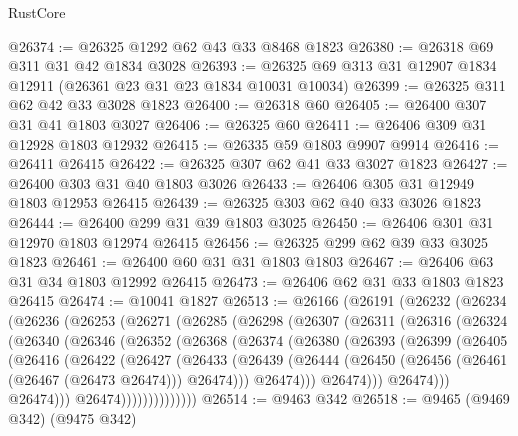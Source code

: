 \begin{lexlean}{RustCore}
\begin{coremodule}
@26374 := @26325 @1292 @62 @43 @33 @8468 @1823
@26380 := @26318 @69 @311 @31 @42 @1834 @3028
@26393 := @26325 @69 @313 @31 @12907 @1834 @12911 (@26361 @23 @31 @23 @1834 @10031 @10034)
@26399 := @26325 @311 @62 @42 @33 @3028 @1823
@26400 := @26318 @60
@26405 := @26400 @307 @31 @41 @1803 @3027
@26406 := @26325 @60
@26411 := @26406 @309 @31 @12928 @1803 @12932
@26415 := @26335 @59 @1803 @9907 @9914
@26416 := @26411 @26415
@26422 := @26325 @307 @62 @41 @33 @3027 @1823
@26427 := @26400 @303 @31 @40 @1803 @3026
@26433 := @26406 @305 @31 @12949 @1803 @12953 @26415
@26439 := @26325 @303 @62 @40 @33 @3026 @1823
@26444 := @26400 @299 @31 @39 @1803 @3025
@26450 := @26406 @301 @31 @12970 @1803 @12974 @26415
@26456 := @26325 @299 @62 @39 @33 @3025 @1823
@26461 := @26400 @60 @31 @31 @1803 @1803
@26467 := @26406 @63 @31 @34 @1803 @12992 @26415
@26473 := @26406 @62 @31 @33 @1803 @1823 @26415
@26474 := @10041 @1827
@26513 := @26166
    (@26191
      (@26232
        (@26234
          (@26236
            (@26253
              (@26271
                (@26285
                  (@26298
                    (@26307
                      (@26311
                        (@26316
                          (@26324
                            (@26340
                              (@26346
                                (@26352
                                  (@26368
                                    (@26374
                                      (@26380
                                        (@26393
                                          (@26399
                                            (@26405
                                              (@26416
                                                (@26422
                                                  (@26427
                                                    (@26433
                                                      (@26439
                                                        (@26444
                                                          (@26450
                                                            (@26456
                                                              (@26461 (@26467 (@26473 @26474)))
                                                              @26474)))
                                                        @26474)))
                                                  @26474)))
                                            @26474)))
                                      @26474)))
                                @26474))))))))))))))
@26514 := @9463 @342
@26518 := @9465 (@9469 @342) (@9475 @342)

\end{coremodule}
\end{lexlean}
